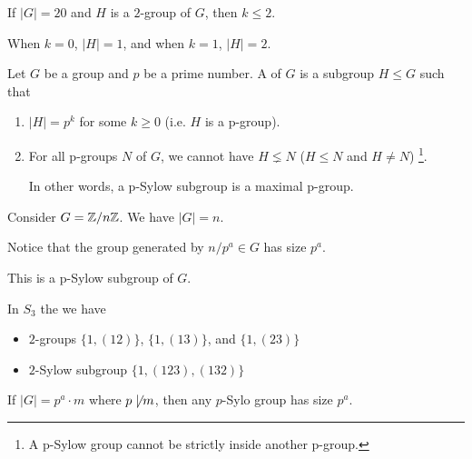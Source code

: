 \begin{example}
    If $|G| = 20$ and $H$ is a $2$-group of $G$, then $k \le 2$. 

    When $k = 0$, $|H| = 1$, and when $k = 1$, $|H| = 2$.
\end{example}

\begin{definition}\label{def:p-sylow-subgroup}
    Let $G$ be a group and $p$ be a prime number. A  of $G$ is a subgroup $H \leq G$ such that \begin{enumerate}
        \item $|H| = p^k$ for some $k \geq 0$ (i.e. $H$ is a p-group).
        \item For all p-groups $N$ of $G$, we cannot have $H \lneq N$ ($H \leq N$ and $H \neq N$) \footnote{A p-Sylow group cannot be strictly inside another p-group.}.
        
        In other words, a p-Sylow subgroup is a maximal p-group.
    \end{enumerate}
\end{definition}

\begin{example}
    Consider $G = \mathbb{Z} / n \mathbb{Z}$. We have $|G| = n$.

    Notice that the group generated by $n / p^a \in G$ has size $p^a$.
    
    This is a p-Sylow subgroup of $G$.
\end{example}

\begin{example}
    In $S_3$ the we have 
    \begin{itemize}
        \item $2$-groups $\{ 1, (12) \}$, $\{ 1, (13) \}$, and $\{ 1, (23) \}$
        \item $2$-Sylow subgroup $\{ 1, (123), (132) \}$
    \end{itemize}
\end{example}

\begin{theorem}\label{thm:first-sylow}
    If $|G| = p^{a} \cdot m$ where $p \not\mid m$, then any $p$-Sylo group has size $p^a$. 
\end{theorem}

